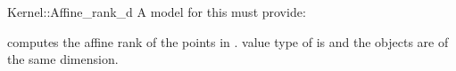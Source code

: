 \begin{ccRefFunctionObjectConcept}{Kernel::Affine_rank_d}
A model for this must provide:


{computes the affine rank of the points in \ccc{A = tuple [first,last)}.
\ccPrecond value type of  is 
and the objects are of the same dimension.}

\end{ccRefFunctionObjectConcept}
